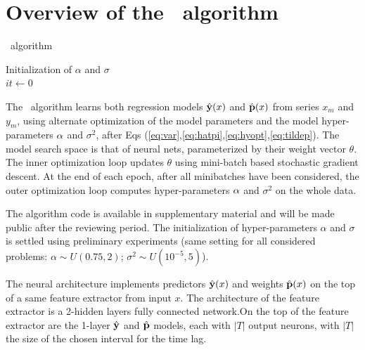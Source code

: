 \section{Overview of the \XX\ algorithm}\label{sec:model}
\begin{algorithm}[H]
  \SetAlgoLined
   \caption{\XX\ algorithm}
   Initialization of $\alpha$ and $\sigma$\\
   $it \longleftarrow 0$ \;
\end{algorithm}
 The \XX\ algorithm learns both regression models $\hat {\bf y}(x)$ and $\hat {\bf p}(x)$ from series $x_m$ and $y_m$, using alternate optimization of the model parameters and the model hyper-parameters ${\bf \alpha}$ and $\sigma^2$, after Eqs (\ref{eq:var},\ref{eq:hatpi},\ref{eq:hyopt},\ref{eq:tildep}). The model search space is that of neural nets, parameterized by their weight vector $\theta$. The inner optimization loop updates $\theta$ using mini-batch based stochastic gradient descent. At the end of each epoch, after all minibatches have been considered, the outer optimization loop computes hyper-parameters ${\bf \alpha}$ and $\sigma^2$ on the whole data. 
 
 The algorithm code is available in supplementary material and will be made public after the reviewing period.
The initialization of hyper-parameters $\alpha$ and $\sigma$ is settled using preliminary experiments (same setting for all considered problems: $\alpha \sim U(0.75, 2)$; $\sigma^2 \sim U(10^{-5}, 5)$).

The neural architecture implements predictors $\hat {\bf y}(x)$ and weights $\hat {\bf p}(x)$ on the top of a same feature extractor from input $x$. %
The architecture of the feature extractor is a 2-hidden layers fully connected network.On the top of the feature extractor are the 1-layer $\hat {\bf y}$ and $\hat {\bf p}$ models, each with $|T|$ output neurons, with $|T|$ the size of the chosen interval for the time lag.

